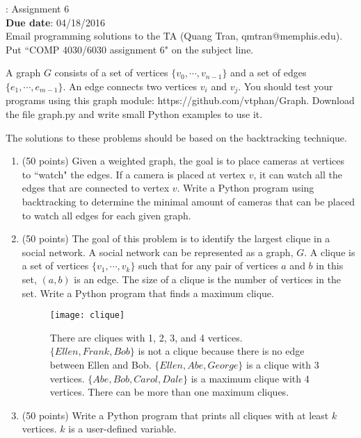\documentclass[11pt, oneside]{article}    %
\newcommand{\hw}[2]{\noindent {\bf COMP 4030/6030}: Assignment #1\\
{\bf Due date}: #2\\}
\begin{document}
\hw{6}{04/18/2016}

Email programming solutions to the TA (Quang Tran, qmtran@memphis.edu).  Put ``COMP 4030/6030 assignment 6" on the subject line.

A graph $G$ consists of a set of vertices $\{v_0, \cdots, v_{n-1} \}$ and a set of edges $\{ e_1, \cdots, e_{m-1}\}$.  An edge connects two vertices $v_i$ and $v_j$.  You should test your programs using this graph module: https://github.com/vtphan/Graph. Download the file graph.py and write small Python examples to use it.
 
 The solutions to these problems should be based on the backtracking technique.
\begin{enumerate}
	\item (50 points) Given a weighted graph, the goal is to place cameras at vertices to ``watch" the edges.  If a camera is placed at vertex $v$, it can watch all the edges that are connected to vertex $v$.  Write a Python program using backtracking to determine the minimal amount of cameras that can be placed to watch all edges for each given graph.

\item (50 points) The goal of this problem is to identify the largest clique in a social network.  A social network can be represented as a graph, $G$.  A clique is a set of vertices $\{v_1, \cdots, v_k\}$ such that for any pair of vertices $a$ and $b$ in this set, $(a,b)$ is an edge.  The size of a clique is the number of vertices in the set.  Write a Python program that finds a maximum clique.
\begin{figure}[hbt]
  \centering
  \texttt{[image: clique]}
  \caption{There are cliques with 1, 2, 3, and 4 vertices.  $\{Ellen, Frank, Bob\}$ is not a clique because there is no edge between Ellen and Bob.  $\{Ellen,Abe,George\}$ is a clique with 3 vertices. $\{Abe, Bob, Carol, Dale\}$ is a maximum clique with 4 vertices.  There can be more than one maximum cliques.}
\end{figure}

\item (50 points) Write a Python program that prints all cliques with at least $k$ vertices.  $k$ is a user-defined variable.  
\end{enumerate}
\end{document}
